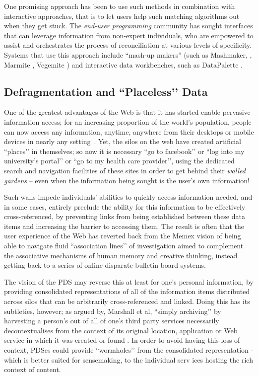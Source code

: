 \documentclass[graybox]{svmult}
\begin{document}
One promising approach has been to use such methods in combination with interactive approaches, that is to let users help such matching algorithms out when they get stuck.  The \emph{end-user programming} community has sought interfaces that can leverage information from non-expert individuals, who are empowered to assist and orchestrates the process of reconciliation at various levels of specificity.  Systems that use this approach include ``mash-up makers'' (such as Mashmaker, \cite{intel_mashmaker}, Marmite \cite{Lin:2009:EPM:1502650.1502667}, Vegemite \cite{Wong:2007:MMM:1240624.1240842}) and interactive data workbenches, such as DataPalette \cite{van2013carpe}.

\subsection{Defragmentation and ``Placeless’’ Data}
One of the greatest advantages of the Web is that it has started enable pervasive information access; for an increasing proportion of the world’s population, people can now access any information, anytime, anywhere from their desktops or mobile devices in nearly any setting~\cite{perry2001dealing}. Yet, the silos on the web have created artificial ``places’’  in themselves; so now it is necessary ``go to facebook’’ or ``log into my university’s portal’’ or ``go to my health care provider’’, using the dedicated search and navigation facilities of these sites in order to get behind their \emph{walled gardens} -- even when the information being sought is the user’s own information!

Such walls impede individuals’ abilities to quickly access information needed, and in some cases, entirely preclude the ability for this information to be effectively cross-referenced, by preventing links from being established between these data items and increasing the barrier to accessing them.  The result is often that the user experience of the Web has reverted back from the Memex vision of being able to navigate fluid ``association lines’’ of investigation aimed to complement the associative mechanisms of human memory and creative thinking, instead getting back to a series of online disparate bulletin board systems.

The vision of the PDS may reverse this at least for one’s personal information, by providing consolidated representations of all of the information items distributed across silos that can be arbitrarily cross-referenced and linked.  Doing this has its subtleties, however;  as argued by, Marshall et al, ``simply archiving’’ by  harvesting a person’s out of all of one’s third party services necessarily decontextualises from the context of its original location, application or Web service in which it was created or found \cite{marshall2011challenges}.  In order to avoid having this loss of context, PDSes could provide ``wormholes’’ from the consolidated representation - which is better suited for sensemaking, to the individual serv ices hosting the rich context of content.
\end{document}
